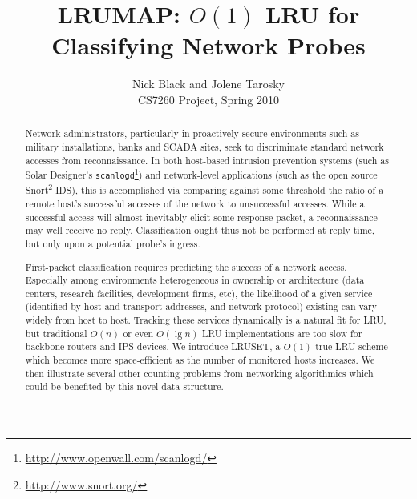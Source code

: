 \documentclass[letterpaper,10pt]{article}
\title{LRUMAP: $O(1)$ LRU for Classifying Network Probes}
\author{Nick Black and Jolene Tarosky\\
CS7260 Project, Spring 2010}
\date{}
\begin{document}
\maketitle

\begin{abstract}
Network administrators, particularly in proactively secure environments such
as military installations, banks and SCADA sites, seek to discriminate standard
network accesses from reconnaissance. In both host-based intrusion prevention
systems (such as Solar Designer's \texttt{scanlogd}\footnote{\url{http://www.openwall.com/scanlogd/}})
and network-level applications (such as the open source Snort\footnote{\url{http://www.snort.org/}} IDS),
this is accomplished via comparing against some threshold the ratio of a remote
host's successful accesses of the network to unsuccessful accesses. While a
successful access will almost inevitably elicit some response packet, a
reconnaissance may well receive no reply. Classification ought thus not be performed
at reply time, but only upon a potential probe's ingress.

First-packet classification requires predicting the success of a network access.
Especially among environments heterogeneous in ownership or architecture (data centers, research facilities,
development firms, etc), the likelihood of a given service (identified by host
and transport addresses, and network protocol) existing can vary widely from
host to host. Tracking these services dynamically is a natural fit for LRU, but
traditional $O(n)$ or even $O(\lg{n})$ LRU implementations are too slow for
backbone routers and IPS devices. We introduce LRUSET, a $O(1)$ true LRU scheme
which becomes more space-efficient as the number of monitored hosts increases.
We then illustrate several other counting problems from networking algorithmics
which could be benefited by this novel data structure.
\end{abstract}
\end{document}
